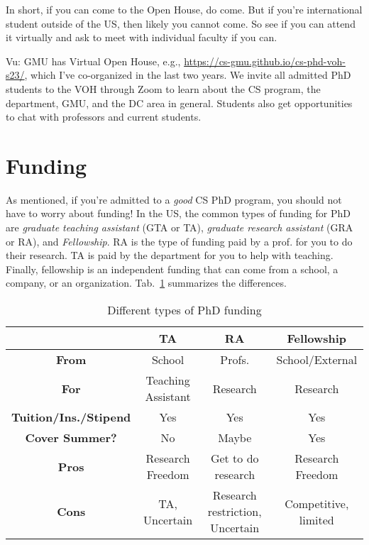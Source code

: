 \documentclass[11pt]{article}
\newenvironment{commentbox}{
 \small
    \begin{cbox}
 }{
   \end{cbox}
}
\begin{document}
In short, if you can come to the Open House, do come.  But if you're international student outside of the US, then likely you cannot come.  So see if you can attend it virtually and ask to meet with individual faculty if you can.

\begin{commentbox}
Vu: GMU has Virtual Open House, e.g., \url{https://cs-gmu.github.io/cs-phd-voh-s23/}, which I've co-organized in the last two years. We invite all admitted PhD students to the VOH through Zoom to learn about the CS program, the department, GMU, and the DC area in general. Students also get opportunities to chat with professors and current students.
\end{commentbox}



\section{Funding}\label{sec:funding}

As mentioned, if you're admitted to a \emph{good} CS PhD program, you should not have to worry about funding!  
In the US, the common types of funding for PhD are \emph{graduate teaching assistant} (GTA or TA), \emph{graduate research assistant} (GRA or RA), and \emph{Fellowship}.
RA is the type of funding paid by a prof. for you to do their research. TA is paid by the department for you to help with teaching. Finally, fellowship is an independent funding that can come from a school, a company, or an organization. Tab.~\ref{tab:funding} summarizes the differences. 

\begin{table}
  \centering
  \footnotesize
  \caption{Different types of PhD funding}\label{tab:funding}
  \begin{tabular}{c|c|c|c}
    \toprule
    &\textbf{TA}&\textbf{RA}&\textbf{Fellowship}\\
    \midrule
    \textbf{From} & School & Profs. & School/External\\
    \textbf{For}                  & Teaching Assistant       & Research                        & Research                              \\
    \textbf{Tuition/Ins./Stipend} & Yes                      & Yes                             & Yes                                   \\
    \textbf{Cover Summer?}              & No                       & Maybe                           & Yes                                   \\
    \midrule
    \textbf{Pros}                 & Research Freedom         & Get to do research              & Research Freedom                      \\
    \textbf{Cons}                 & TA, Uncertain            & Research restriction, Uncertain & Competitive, limited             \\
    \bottomrule
  \end{tabular}
\end{table}
\end{document}
